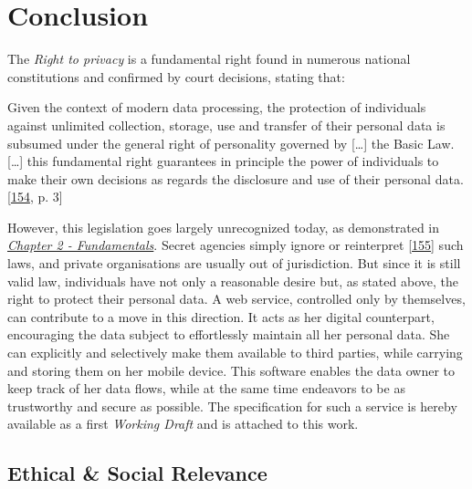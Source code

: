 \documentclass[12pt,english,a4paper,titlepage,cleardoublepage=empty,dottedtoc]{report}
\let\origquote\quote
\let\endorigquote\endquote
\renewenvironment{quote}{%
    \origquote
    \itshape
}
{\endorigquote}
\begin{document}
\chapter{Conclusion}\label{conclusion}

The \emph{Right to privacy} is a fundamental right found in numerous
national constitutions and confirmed by court decisions, stating that:

\begin{quote}
Given the context of modern data processing, the protection of
individuals against unlimited collection, storage, use and transfer of
their personal data is subsumed under the general right of personality
governed by {[}\ldots{}{]} the Basic Law. {[}\ldots{}{]} this
fundamental right guarantees in principle the power of individuals to
make their own decisions as regards the disclosure and use of their
personal data.
{[}\protect\hyperlink{ref-court-decision_1983_census-act-germany}{154},
p. 3{]}
\end{quote}

However, this legislation goes largely unrecognized today, as
demonstrated in \emph{\protect\hyperlink{fundamentals}{Chapter 2 -
Fundamentals}}. Secret agencies simply ignore or reinterpret
{[}\protect\hyperlink{ref-web_2016_bnd-weltraumtheorie}{155}{]} such
laws, and private organisations are usually out of jurisdiction. But
since it is still valid law, individuals have not only a reasonable
desire but, as stated above, the right to protect their personal data. A
web service, controlled only by themselves, can contribute to a move in
this direction. It acts as her digital counterpart, encouraging the data
subject to effortlessly maintain all her personal data. She can
explicitly and selectively make them available to third parties, while
carrying and storing them on her mobile device. This software enables
the data owner to keep track of her data flows, while at the same time
endeavors to be as trustworthy and secure as possible. The specification
for such a service is hereby available as a first \emph{Working Draft}
and is attached to this work.

\hypertarget{ethical-social-relevance}{\section{Ethical \& Social
Relevance}\label{ethical-social-relevance}}
\end{document}

